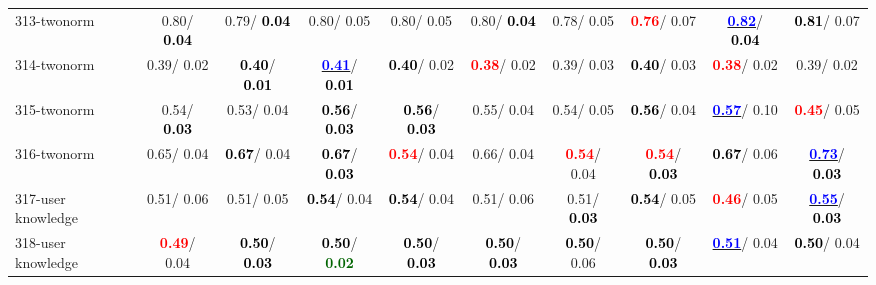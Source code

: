 \begin{table}[h]
\begin{center}
{\begin{tabular}{lc|c|c|c|c|c|c|c|c}
313-twonorm &   0.80/\textcolor{black}{\textbf{  0.04}} &   0.79/\textcolor{black}{\textbf{  0.04}} &   0.80/  0.05 &   0.80/  0.05 &   0.80/\textcolor{black}{\textbf{  0.04}} &   0.78/  0.05 & \textcolor{red}{\textbf{  0.76}}/  0.07 & \underline{\textcolor{blue}{\textbf{  0.82}}}/\textcolor{black}{\textbf{  0.04}} & \textcolor{black}{\textbf{  0.81}}/  0.07 \\
314-twonorm &   0.39/  0.02 & \textcolor{black}{\textbf{  0.40}}/\textcolor{black}{\textbf{  0.01}} & \underline{\textcolor{blue}{\textbf{  0.41}}}/\textcolor{black}{\textbf{  0.01}} & \textcolor{black}{\textbf{  0.40}}/  0.02 & \textcolor{red}{\textbf{  0.38}}/  0.02 &   0.39/  0.03 & \textcolor{black}{\textbf{  0.40}}/  0.03 & \textcolor{red}{\textbf{  0.38}}/  0.02 &   0.39/  0.02 \\
315-twonorm &   0.54/\textcolor{black}{\textbf{  0.03}} &   0.53/  0.04 & \textcolor{black}{\textbf{  0.56}}/\textcolor{black}{\textbf{  0.03}} & \textcolor{black}{\textbf{  0.56}}/\textcolor{black}{\textbf{  0.03}} &   0.55/  0.04 &   0.54/  0.05 & \textcolor{black}{\textbf{  0.56}}/  0.04 & \underline{\textcolor{blue}{\textbf{  0.57}}}/  0.10 & \textcolor{red}{\textbf{  0.45}}/  0.05 \\
316-twonorm &   0.65/  0.04 & \textcolor{black}{\textbf{  0.67}}/  0.04 & \textcolor{black}{\textbf{  0.67}}/\textcolor{black}{\textbf{  0.03}} & \textcolor{red}{\textbf{  0.54}}/  0.04 &   0.66/  0.04 & \textcolor{red}{\textbf{  0.54}}/  0.04 & \textcolor{red}{\textbf{  0.54}}/\textcolor{black}{\textbf{  0.03}} & \textcolor{black}{\textbf{  0.67}}/  0.06 & \underline{\textcolor{blue}{\textbf{  0.73}}}/\textcolor{black}{\textbf{  0.03}} \\ \hline
317-user knowledge &   0.51/  0.06 &   0.51/  0.05 & \textcolor{black}{\textbf{  0.54}}/  0.04 & \textcolor{black}{\textbf{  0.54}}/  0.04 &   0.51/  0.06 &   0.51/\textcolor{black}{\textbf{  0.03}} & \textcolor{black}{\textbf{  0.54}}/  0.05 & \textcolor{red}{\textbf{  0.46}}/  0.05 & \underline{\textcolor{blue}{\textbf{  0.55}}}/\textcolor{black}{\textbf{  0.03}} \\
318-user knowledge & \textcolor{red}{\textbf{  0.49}}/  0.04 & \textcolor{black}{\textbf{  0.50}}/\textcolor{black}{\textbf{  0.03}} & \textcolor{black}{\textbf{  0.50}}/\textcolor{darkgreen}{\textbf{  0.02}} & \textcolor{black}{\textbf{  0.50}}/\textcolor{black}{\textbf{  0.03}} & \textcolor{black}{\textbf{  0.50}}/\textcolor{black}{\textbf{  0.03}} & \textcolor{black}{\textbf{  0.50}}/  0.06 & \textcolor{black}{\textbf{  0.50}}/\textcolor{black}{\textbf{  0.03}} & \underline{\textcolor{blue}{\textbf{  0.51}}}/  0.04 & \textcolor{black}{\textbf{  0.50}}/  0.04 \\

\end{tabular}}
\end{center}
\end{table}
